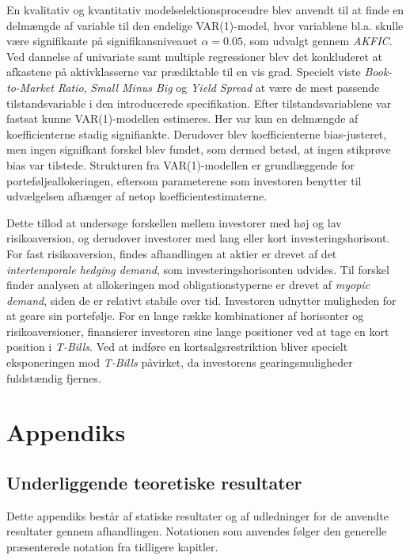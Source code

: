 \documentclass[
  a4paper,
  oneside]{memoir}
\begin{document}
En kvalitativ og kvantitativ modelselektionsproceudre blev anvendt til at finde en delmængde af variable til den endelige VAR(1)-model, hvor variablene bl.a. skulle være signifikante på signifikansniveauet \(\alpha=0.05\), som udvalgt gennem \emph{AKFIC}. Ved dannelse af univariate samt multiple regressioner blev det konkluderet at afkastene på aktivklasserne var prædiktable til en vis grad. Specielt viste \emph{Book-to-Market Ratio}, \emph{Small Minus Big} og \emph{Yield Spread} at være de mest passende tilstandsvariable i den introducerede specifikation. Efter tilstandsvariablene var fastsat kunne VAR(1)-modellen estimeres. Her var kun en delmængde af koefficienterne stadig signifiankte. Derudover blev koefficienterne bias-justeret, men ingen signifkant forskel blev fundet, som dermed betød, at ingen stikprøve bias var tilstede. Strukturen fra VAR(1)-modellen er grundlæggende for porteføljeallokeringen, eftersom parameterene som investoren benytter til udvælgelsen afhænger af netop koefficientestimaterne.

Dette tillod at undersøge forskellen mellem investorer med høj og lav risikoaversion, og derudover investorer med lang eller kort investeringshorisont. For fast risikoaversion, findes afhandlingen at aktier er drevet af det \emph{intertemporale hedging demand}, som investeringshorisonten udvides. Til forskel finder analysen at allokeringen mod obligationstyperne er drevet af \emph{myopic demand}, siden de er relativt stabile over tid. Investoren udnytter muligheden for at geare sin portefølje. For en lange række kombinationer af horisonter og risikoaversioner, finansierer investoren sine lange positioner ved at tage en kort position i \emph{T-Bills}. Ved at indføre en kortsalgsrestriktion bliver specielt eksponeringen mod \emph{T-Bills} påvirket, da investorens gearingsmuligheder fuldstændig fjernes.

\hypertarget{appendix-appendiks}{%
\appendix}


\part{Appendiks}

\hypertarget{underligteo}{%
\chapter{Underliggende teoretiske resultater}\label{underligteo}}

Dette appendiks består af statiske resultater og af udledninger for de anvendte resultater gennem afhandlingen. Notationen som anvendes følger den generelle præsenterede notation fra tidligere kapitler.
\end{document}

